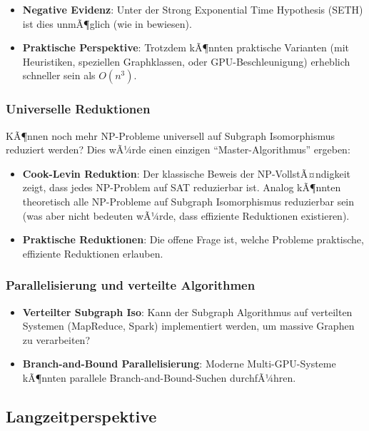 ﻿\documentclass[a4paper,12pt]{article}
\theoremstyle{definition}
\begin{document}
\begin{itemize}
	\item \textbf{Negative Evidenz}: Unter der Strong Exponential Time Hypothesis (SETH) ist dies unmÃ¶glich (wie in \cite{subgraph2026} bewiesen).
	
	\item \textbf{Praktische Perspektive}: Trotzdem kÃ¶nnten praktische Varianten (mit Heuristiken, speziellen Graphklassen, oder GPU-Beschleunigung) erheblich schneller sein als $O(n^3)$.
\end{itemize}

\subsubsection{Universelle Reduktionen}

KÃ¶nnen noch mehr NP-Probleme universell auf Subgraph Isomorphismus reduziert werden? Dies wÃ¼rde einen einzigen ``Master-Algorithmus'' ergeben:

\begin{itemize}
	\item \textbf{Cook-Levin Reduktion}: Der klassische Beweis der NP-VollstÃ¤ndigkeit zeigt, dass jedes NP-Problem auf SAT reduzierbar ist. Analog kÃ¶nnten theoretisch alle NP-Probleme auf Subgraph Isomorphismus reduzierbar sein (was aber nicht bedeuten wÃ¼rde, dass effiziente Reduktionen existieren).
	
	\item \textbf{Praktische Reduktionen}: Die offene Frage ist, welche Probleme praktische, effiziente Reduktionen erlauben.
\end{itemize}

\subsubsection{Parallelisierung und verteilte Algorithmen}

\begin{itemize}
	\item \textbf{Verteilter Subgraph Iso}: Kann der Subgraph Algorithmus auf verteilten Systemen (MapReduce, Spark) implementiert werden, um massive Graphen zu verarbeiten?
	
	\item \textbf{Branch-and-Bound Parallelisierung}: Moderne Multi-GPU-Systeme kÃ¶nnten parallele Branch-and-Bound-Suchen durchfÃ¼hren.
\end{itemize}

\subsection{Langzeitperspektive}
\end{document}
